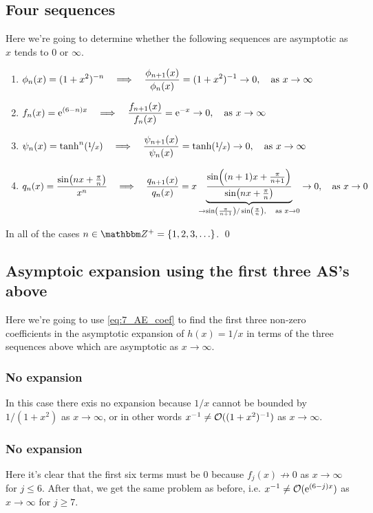 \documentclass[11pt,letter, swedish, english
]{article}
\begin{document}
\subsection{Four sequences}
Here we're going to determine whether the following sequences are
asymptotic as $x$ tends to $0$ or $\infty$.

\begin{enumerate}[label=(\roman*)]
\item $\displaystyle \phi_n(x)=(1+x^2)^{-n} \quad\Longrightarrow\quad
\frac{\phi_{n+1}(x)}{\phi_{n}(x)}=(1+x^2)^{-1}\to0\as x\to\infty$
\item $\displaystyle f_n(x)=\ee^{(6-n)x} \quad\Longrightarrow\quad
\frac{f_{n+1}(x)}{f_{n}(x)}=\ee^{-x}\to0\as x\to\infty$
\item $\displaystyle \psi_n(x)=\tanh^n(\nicefrac{1}{x}) \quad\Longrightarrow\quad
\frac{\psi_{n+1}(x)}{\psi_{n}(x)}=\tanh(\nicefrac{1}{x})\to0\as
x\to\infty$
\item $\displaystyle q_n(x)=\frac{\sin(nx+\frac{\pi}{n})}{x^n} \quad\Longrightarrow\quad
\frac{q_{n+1}(x)}{q_{n}(x)}=
x\underbrace{\frac{\sin((n+1)x+\frac{\pi}{n+1})}
{\sin(nx+\frac{\pi}{n})}}_{\to
\sin(\frac{\pi}{n+1})/\sin(\frac{\pi}{n})\as x\to0 }
\to0\as x\to0$
\end{enumerate}
In all of the cases $n\in\Z^+=\{1, 2, 3, \ldots\}$.
\qed

\subsection{Asymptoic expansion using the first three AS's above}
Here we're going to use \eqref{eq:7_AE_coef} to find the first three
non-zero coefficients in the asymptotic expansion of $h(x)=1/x$ in
terms of the three sequences above which are asymptotic as
$x\to\infty$. 

\subsubsection{No expansion}
In this case there exis no expansion because $1/x$ cannot be bounded
by $1/(1+x^2)$ as $x\to\infty$, or in other words
$x^{-1}\neq\order*{(1+x^2)^{-1}}$ as $x\to\infty$.

\subsubsection{No expansion}
Here it's clear that the first six terms must be 0 because
$f_j(x)\not\to0$ as $x\to\infty$ for $j\le6$. After that, we get the
same problem as before, i.e. $x^{-1}\neq\order*{\ee^{(6-j)x}}$ as
$x\to\infty$ for $j\ge7$. 
\end{document}
